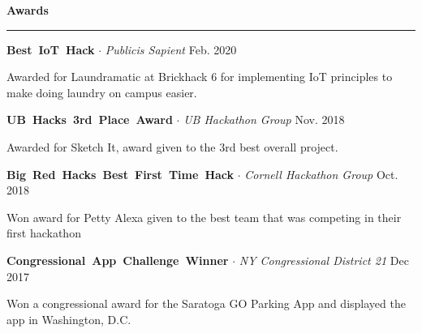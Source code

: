 \documentclass{article}
\newcommand{\rSection}[1] {
  \textcolor{header-blue} {
    \textbf{{\fontsize{0.5cm}{0.45cm}\selectfont \hbox{#1}}} \\
    \rule{0.30\textwidth}{0.1cm}
  }
}
\newcommand{\rSubSubSection}[1] {
  \textbf{{\fontsize{0.35cm}{0.45cm}\selectfont \hbox{#1}}}
}
\begin{document}
\rSection{Awards} \par

\rSubSubSection{Best IoT Hack} $ \cdot $ \textit{Publicis Sapient} \hfill Feb. 2020 \par 
Awarded for Laundramatic at Brickhack 6 for implementing IoT principles to make doing laundry on campus easier. \par \bigskip

\rSubSubSection{UB Hacks 3rd Place Award} $ \cdot $ \textit{UB Hackathon Group} \hfill Nov. 2018 \par
Awarded for Sketch It, award given to the 3rd best overall project. \par \bigskip

\rSubSubSection{Big Red Hacks Best First Time Hack} $ \cdot $ \textit{Cornell Hackathon Group} \hfill Oct. 2018 \par
Won award for Petty Alexa given to the best team that was competing in their first hackathon \par \bigskip
 
\rSubSubSection{Congressional App Challenge Winner} $ \cdot $ \textit{NY Congressional District 21} \hfill Dec 2017 \par
Won a congressional award for the Saratoga GO Parking App and displayed the app in Washington, D.C.
\end{document}

